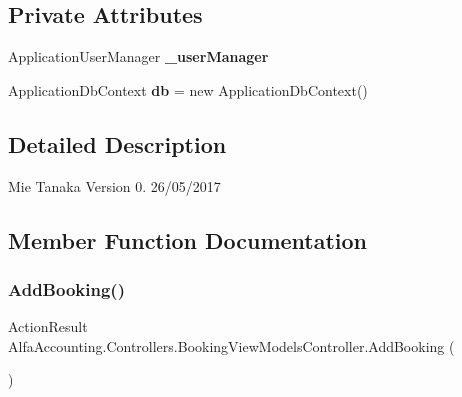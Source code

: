 \subsection*{Private Attributes}
\begin{DoxyCompactItemize}
\item 
\mbox{\label{class_alfa_accounting_1_1_controllers_1_1_booking_view_models_controller_a9d1735d1e296cc775c51775b052af941}} 
Application\+User\+Manager {\bfseries \+\_\+user\+Manager}
\item 
\mbox{\label{class_alfa_accounting_1_1_controllers_1_1_booking_view_models_controller_a529ad925d1c229227b1404ff1097fcc8}} 
Application\+Db\+Context {\bfseries db} = new Application\+Db\+Context()
\end{DoxyCompactItemize}


\subsection{Detailed Description}


Mie Tanaka Version 0. 26/05/2017 

\subsection{Member Function Documentation}
\mbox{\label{class_alfa_accounting_1_1_controllers_1_1_booking_view_models_controller_a5c17315b4daf73640327bfefa8b34ad7}} 
\subsubsection{\texorpdfstring{Add\+Booking()}{AddBooking()}\hspace{0.1cm}{\footnotesize\ttfamily [1/2]}}
{\footnotesize\ttfamily Action\+Result Alfa\+Accounting.\+Controllers.\+Booking\+View\+Models\+Controller.\+Add\+Booking (\begin{DoxyParamCaption}{ }\end{DoxyParamCaption})}



